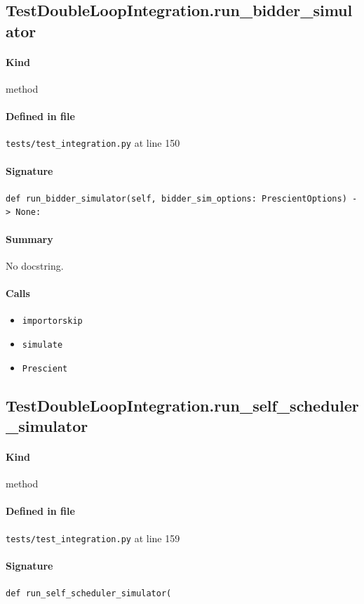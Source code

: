 \documentclass[11pt]{report}
\begin{document}
\subsection{TestDoubleLoopIntegration.run\_bidder\_simulator}
\label{def:tests-test_integration.py:TestDoubleLoopIntegration.run_bidder_simulator:L150}
\paragraph{Kind} method
\paragraph{Defined in file} \texttt{tests/test\_integration.py} at line 150
\paragraph{Signature} \texttt{def run\_bidder\_simulator(self, bidder\_sim\_options: PrescientOptions) -> None:}
\paragraph{Summary} No docstring.
\paragraph{Calls}
\begin{itemize}[leftmargin=*]
  \item \texttt{importorskip}
  \item \texttt{simulate}
  \item \texttt{Prescient}
\end{itemize}
\subsection{TestDoubleLoopIntegration.run\_self\_scheduler\_simulator}
\label{def:tests-test_integration.py:TestDoubleLoopIntegration.run_self_scheduler_simulator:L159}
\paragraph{Kind} method
\paragraph{Defined in file} \texttt{tests/test\_integration.py} at line 159
\paragraph{Signature} \texttt{def run\_self\_scheduler\_simulator(}
\end{document}
